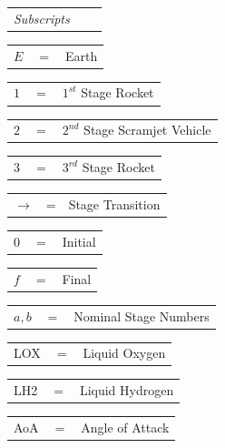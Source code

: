 \documentclass[]{aiaa-tc}
\begin{document}
	  	\newline  	
	  	\begin{tabular}{p{5.2cm}p{1cm}p{5cm}}


\textit{Subscripts} \\
\end{tabular} 
\newline
\begin{tabular}{p{1.2cm}p{1cm}p{5cm}}
	$E$ & $=$ & Earth\\
	
\end{tabular} 
\begin{tabular}{p{1.2cm}p{1cm}p{5cm}}
$1$ & $=$ & $1^{st}$ Stage Rocket\\
\end{tabular} 
\begin{tabular}{p{1.2cm}p{1cm}p{5cm}}
	$2$ & $=$ & $2^{nd}$ Stage Scramjet Vehicle\\
		\end{tabular} 
		\begin{tabular}{p{1.2cm}p{1cm}p{5cm}}
	$3$ & $=$ & $3^{rd}$ Stage Rocket\\
		\end{tabular} 
		\begin{tabular}{p{1.2cm}p{1cm}p{5cm}}
	$\rightarrow$ & = & Stage Transition\\
		\end{tabular} 
				\begin{tabular}{p{1.2cm}p{1cm}p{5cm}}
					$0$ & $=$ & Initial\\
				\end{tabular} 
		\begin{tabular}{p{1.2cm}p{1cm}p{5cm}}
	$f$ & $=$ & Final\\
\end{tabular} 
\begin{tabular}{p{1.2cm}p{1cm}p{5cm}}
	$a,b$ & $=$ & Nominal Stage Numbers\\
\end{tabular} 
\begin{tabular}{p{1.2cm}p{1cm}p{5cm}}
	LOX & $=$ & Liquid Oxygen\\
\end{tabular} 
\begin{tabular}{p{1.2cm}p{1cm}p{5cm}}
	LH2 & $=$ & Liquid Hydrogen\\
	
\end{tabular} 
\begin{tabular}{p{1.2cm}p{1cm}p{5cm}}
	AoA & $=$ & Angle of Attack\\
	
\end{tabular} 
\end{document}

